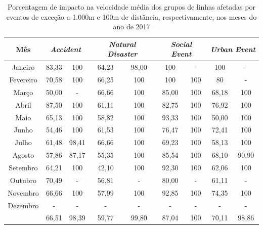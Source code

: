 \documentclass[
	12pt,				%
	oneside,			%
	a4paper,			%
	english,			%
	brazil				%
	]{abntex2ppgsi}
\begin{document}
\begin{table}[!htb]
\centering
\caption {Porcentagem de impacto na velocidade média dos grupos de linhas afetadas por eventos de exceção a 1.000m e 100m de distância, respectivamente, nos meses do ano de 2017}
\label {tab:exceptEventVelocityImpAll}
\begin{tabular}{c|cc|cc|cc|cc}
\toprule
\textbf{Mês} & \multicolumn{2}{c}{\textit{\textbf{Accident}}} & \multicolumn{2}{c}{\textit{\textbf{Natural Disaster}}} & \multicolumn{2}{c}{\textit{\textbf{Social Event}}} &
\multicolumn{2}{c}{\textit{\textbf{Urban Event}}}\\
\midrule
Janeiro & 83,33 &  100 & 
64,23 &  98,00 & 
100 & - &
 100 & - \\
\hline
Fevereiro & 70,58 &  100 &
 66,25 &  100 &
 100 & 100 &
 80 & - \\
\hline
Março &  50,00 &  - & 
66,66 &  100 &
85,00 & 100 &
68,18 & 100 \\
\hline
Abril & 87,50 &100 & 
 61,11 & 100 & 
 82,75 & 100 & 
 76,92 &  100 \\
\hline
Maio & 65,13 &  100 &
 58,82 &  100 &
 93,33 & 100 &
 50,00 & 100 \\
\hline
Junho & 54,46 &  100 &
 61,53 &  100 &
 76,47 & 100 &
 72,41 & 100 \\
\hline
Julho & 61,48 &  98,41 &
 66,66 & 100 &
 69,23 & 100 &
58,13 & 100 \\
\hline
Agosto & 57,86 & 87,17 &
 55,35 & 100 &
 85,54 & 100 & 
 68,10 & 90,90 \\
\hline
Setembro & 64,21 & 100 &
 42,10 & 100 &
 92,30 & 100 & 
 62,06 & 100 \\
\hline
Outubro & 70,49 & - &
 56,81 & - &
 80,00 & - &
 61,11 & - \\
\hline
Novembro & 66,66 & 100 &
 57,99 & 100 &
 92,85 & 100 &
 74,35 & 100 \\
\hline
Dezembro & - & - & - & - & - & - & - & -  \\
\midrule
{} & 66,51 & 98,39 & 59,77 & 99,80 & 87,04 & 100 & 70,11 & 98,86  \\
\bottomrule
\end{tabular}
\end{table}
\end{document}
